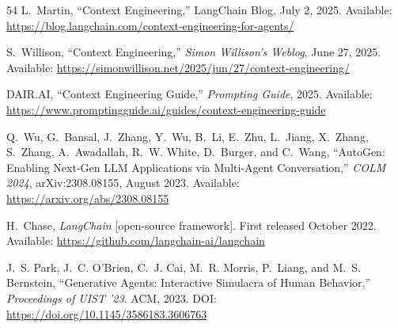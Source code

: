 \documentclass[acmlarge,nonacm,screen]{acmart}
\begin{document}
\begin{thebibliography}{54}
L.~Martin,
``Context Engineering,''
LangChain Blog, July 2, 2025.
\newline Available: \url{https://blog.langchain.com/context-engineering-for-agents/}

S.~Willison,
``Context Engineering,''
\textit{Simon Willison's Weblog}, June 27, 2025.
\newline Available: \url{https://simonwillison.net/2025/jun/27/context-engineering/}

DAIR.AI,
``Context Engineering Guide,''
\textit{Prompting Guide}, 2025.
\newline Available: \url{https://www.promptingguide.ai/guides/context-engineering-guide}


Q.~Wu, G.~Bansal, J.~Zhang, Y.~Wu, B.~Li, E.~Zhu, L.~Jiang, X.~Zhang, S.~Zhang, A.~Awadallah, R.~W. White, D.~Burger, and C.~Wang,
``AutoGen: Enabling Next-Gen LLM Applications via Multi-Agent Conversation,''
\textit{COLM 2024}, arXiv:2308.08155, August 2023.
\newline Available: \url{https://arxiv.org/abs/2308.08155}

H.~Chase,
\textit{LangChain} [open-source framework].
First released October 2022.
\newline Available: \url{https://github.com/langchain-ai/langchain}

J.~S. Park, J.~C. O'Brien, C.~J. Cai, M.~R. Morris, P.~Liang, and M.~S. Bernstein,
``Generative Agents: Interactive Simulacra of Human Behavior,''
\textit{Proceedings of UIST '23}. ACM, 2023.
\newline DOI: \url{https://doi.org/10.1145/3586183.3606763}


\end{thebibliography}
\end{document}
